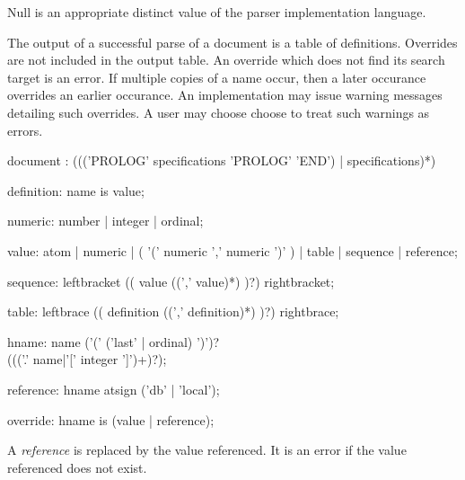 \documentclass[twoside]{memarticle}
\begin{document}
Null is an appropriate distinct value of the parser implementation language.

The output of a successful parse of a document is a
table of definitions.
Overrides are not included in the output table.
An override which does not find its search target is an error.
If multiple copies of a name occur,
then a later occurance overrides an earlier occurance.
An implementation may issue warning messages detailing such overrides.
A user may choose choose to treat such warnings as errors.


\begin{rail}
document : ((('PROLOG' specifications 'PROLOG' 'END') | specifications)*)
\end{rail}

\begin{rail}
	definition: name is value;
\end{rail}

\begin{rail}
	numeric: number | integer | ordinal;
\end{rail}

\begin{rail}
	value: atom | numeric | ( '(' numeric ',' numeric ')' ) |
               table | sequence | reference;
\end{rail}

\begin{rail}
	sequence: leftbracket (( value ((',' value)*) )?) rightbracket;
\end{rail}

\begin{rail}
	table: leftbrace (( definition ((',' definition)*) )?) rightbrace;
\end{rail}

\begin{rail}
        hname: name ('(' ('last' | ordinal) ')')?
        \\ ((('.' name|'[' integer ']')+)?);
\end{rail}

\begin{rail}
        reference: hname atsign ('db' | 'local');
\end{rail}

\begin{rail}
        override: hname is (value | reference);
\end{rail}

A {\em reference} is replaced by the value referenced.
It is an error if the value referenced does not exist.
\end{document}
